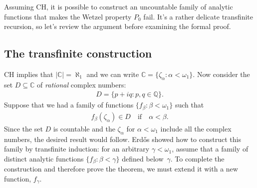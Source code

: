 \documentclass[runningheads]{llncs}
\begin{document}
Assuming CH, it is possible to construct an uncountable family of analytic functions that makes the Wetzel property $P_0$ fail.
It's a rather delicate transfinite recursion, so let's review the argument before examining the formal proof.

\subsection{The transfinite construction}

CH implies that $|\mathbb{C}| = \aleph_1$ and we can write $\mathbb{C} = \{\zeta_\alpha : \alpha < \omega_1 \}$.
Now consider the set $D\subseteq\mathbb{C}$ of \textit{rational} complex numbers: 
\begin{align*}
 D = \{p+iq: p,q\in\mathbb{Q}\}.
\end{align*}
Suppose that we had a family of functions 
 $\{f_\beta : \beta < \omega_1 \}$ such that 
\begin{align}\label{eqn:f_in_D}
	f_\beta (\zeta_\alpha) \in D\quad\text{if}\quad\alpha<\beta.
\end{align} 
 Since the set $D$ is countable and the $\zeta_\alpha$ for $\alpha < \omega_1$ include all the complex numbers, the desired result would follow.
Erd\H{o}s showed how to construct this family by transfinite induction: for an arbitrary $\gamma<\omega_1$, assume that a family of distinct analytic functions $\{f_\beta: \beta<\gamma\}$ defined below~$\gamma$.
To complete the construction and therefore prove the theorem, we must extend it with a new function, $f_\gamma$.
\end{document}
